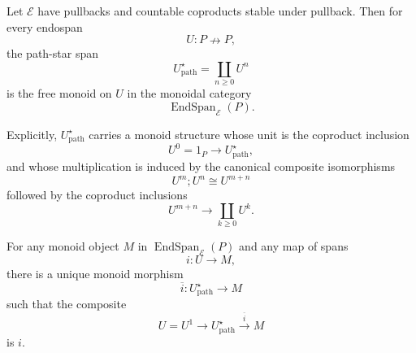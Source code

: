 \begin{theorem}
\label{thm:path-star-free-monoid}
Let \(\mathcal E\) have pullbacks and countable coproducts stable under pullback. Then for every endospan
\[
U:P\nrightarrow P,
\]
the path-star span
\[
U^\star_{\mathrm{path}}
=
\coprod_{n\ge0}U^n
\]
is the free monoid on \(U\) in the monoidal category
\[
\operatorname{EndSpan}_{\mathcal E}(P).
\]

Explicitly, \(U^\star_{\mathrm{path}}\) carries a monoid structure whose unit is the coproduct inclusion
\[
U^0=1_P\to U^\star_{\mathrm{path}},
\]
and whose multiplication is induced by the canonical composite isomorphisms
\[
U^m;U^n\cong U^{m+n}
\]
followed by the coproduct inclusions
\[
U^{m+n}\to \coprod_{k\ge0}U^k.
\]

For any monoid object \(M\) in \(\operatorname{EndSpan}_{\mathcal E}(P)\) and any map of spans
\[
i:U\to M,
\]
there is a unique monoid morphism
\[
\overline{i}:U^\star_{\mathrm{path}}\to M
\]
such that the composite
\[
U=U^1\to U^\star_{\mathrm{path}}\xrightarrow{\overline{i}}M
\]
is \(i\).
\end{theorem}

